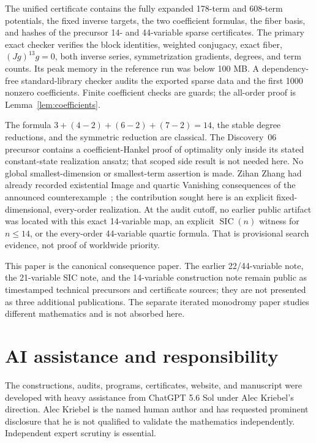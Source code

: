\documentclass[11pt]{article}
\newcommand{\SIC}{\operatorname{SIC}}
\begin{document}
The unified certificate contains the fully expanded 178-term and 608-term
potentials, the fixed inverse targets, the two coefficient formulas, the
fiber basis, and hashes of the precursor 14- and 44-variable sparse
certificates.  The primary exact checker verifies the block identities,
weighted conjugacy, exact fiber, $(Jg)^{13}g=0$, both inverse series,
symmetrization gradients, degrees, and term counts.  Its peak memory in the
reference run was below 100 MB.  A dependency-free standard-library checker
audits the exported sparse data and the first 1000 nonzero coefficients.
Finite coefficient checks are guards; the all-order proof is
Lemma~\ref{lem:coefficients}.

The formula $3+(4-2)+(6-2)+(7-2)=14$, the stable degree reductions, and the
symmetric reduction are classical.  The Discovery~06 precursor contains a
coefficient-Hankel proof of optimality only inside its stated constant-state
realization ansatz; that scoped side result is not needed here.  No global
smallest-dimension or smallest-term assertion is made.  Zihan Zhang had
already recorded existential Image and quartic Vanishing consequences of the
announced counterexample~\cite{zhang}; the contribution sought here is an
explicit fixed-dimensional, every-order realization.  At the audit cutoff,
no earlier public artifact was located with this exact 14-variable map, an
explicit $\SIC(n)$ witness for $n\le14$, or the every-order 44-variable
quartic formula.  That is provisional search evidence, not proof of worldwide
priority.

This paper is the canonical consequence paper.  The earlier 22/44-variable
note, the 21-variable SIC note, and the 14-variable construction note remain
public as timestamped technical precursors and certificate sources; they are
not presented as three additional publications.  The separate iterated
monodromy paper studies different mathematics and is not absorbed here.

\section*{AI assistance and responsibility}

The constructions, audits, programs, certificates, website, and manuscript
were developed with heavy assistance from ChatGPT 5.6 Sol under Alec
Kriebel's direction.  Alec Kriebel is the named human author and has requested
prominent disclosure that he is not qualified to validate the mathematics
independently.  Independent expert scrutiny is essential.
\end{document}
